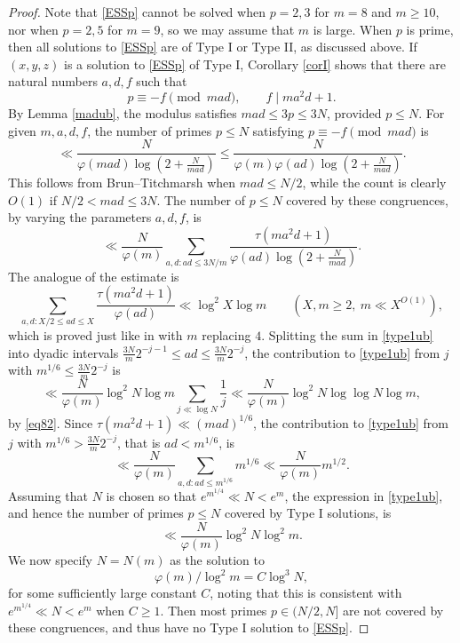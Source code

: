 \documentclass[12pt]{amsart}
\theoremstyle{definition}
\theoremstyle{remark}
\numberwithin{equation}{section}
\begin{document}
\begin{proof}
Note that \eqref{ESSp} cannot be solved when $p=2,3$ for $m=8$ and $m\ge10$,
nor when $p=2,5$ for $m=9$, so
 we may assume that $m$ is large. 
When $p$ is prime, then all solutions to \eqref{ESSp} are of Type I or Type II, as discussed
above.  If $(x,y,z)$ is a solution to \eqref{ESSp} of Type I, Corollary \ref{corI}
shows that there are natural numbers $a,d,f$ such that
$$
p\equiv -f \pmod{mad}, \qquad f\mid ma^2 d+1.
$$
By Lemma \ref{madub}, the modulus satisfies $mad \le 3p \le 3N$, provided $p\le N$.
For given $m,a,d,f$, the number of primes $p\le N$ satisfying $p\equiv - f \pmod{ mad}$ is 
$$ \ll \frac{N}{\varphi(mad) \log(2+ \frac{N}{mad})} \le \frac{N}{\varphi(m) \varphi(ad) \log(2+ \frac{N}{mad})} .$$
This follows from Brun--Titchmarsh when $mad \le N/2$, while the count is clearly $O(1)$ if $N/2<mad \le 3N$. 
The number of $p\le N$ covered by these congruences, by varying the parameters $a, d, f$, is 
\begin{equation}\label{type1ub}
\ll   \frac{N}{\varphi(m)} \sum_{a,d: ad \le 3N/m}\frac{\tau(ma^2 d +1)}{ \varphi(ad) \log(2+ \frac{N}{mad})} .
\end{equation}
The analogue of the estimate \cite[Eq. (8.2)]{ET} is  
\begin{equation}\label{eq82}
\sum_{a,d: X/2 \le ad \le X}\frac{\tau(ma^2 d +1)}{ \varphi(ad) } \ll \log^2 X \log m \qquad (X,m \ge 2,\ m\ll X^{O(1)}),
\end{equation}
which is proved just like in \cite{ET} with $m$ replacing $4$.
Splitting the sum in \eqref{type1ub} into dyadic intervals $\frac{3N}{m}2^{-j-1}\le ad \le \frac{3N}{m}2^{-j}$, 
the contribution to \eqref{type1ub} from $j$ with $m^{1/6} \le \frac{3N}{m}2^{-j}$ is
$$
\ll \frac{N}{\varphi(m)} \log^2 N \log m \sum_{ j \ll \log N} \frac{1}{j} \ll \frac{N}{\varphi(m)} \log^2 N \log\log N \log m ,
$$
by \eqref{eq82}.
Since $\tau(ma^2d+1)\ll (mad)^{1/6}$, 
the contribution to \eqref{type1ub} from $j$ with $m^{1/6} > \frac{3N}{m}2^{-j}$, that is $ad < m^{1/6}$, is
$$
\ll \frac{N}{\varphi(m)}  \sum_{a,d: ad \le m^{1/6} }m^{1/6} \ll \frac{N}{\varphi(m)}  m^{1/2}.
$$
Assuming that $N$ is chosen so that $e^{m^{1/4}} \ll N<e^m$, the expression in \eqref{type1ub}, 
and hence the number of primes  $p\le N$ covered by Type I solutions, is
$$
\ll \frac{N}{\varphi(m)}\log^2 N \log^2 m.
$$
We now specify $N=N(m)$ as  the solution to
$$\varphi(m)/\log^2 m= C \log^3 N ,$$ 
for some sufficiently large constant $C$, noting that this is consistent with $e^{m^{1/4}} \ll N<e^m$ when $C\ge1$.
Then most primes $p\in (N/2,N]$
are not covered by these congruences, and thus have no Type I solution to \eqref{ESSp}.


\end{proof}
\end{document}

